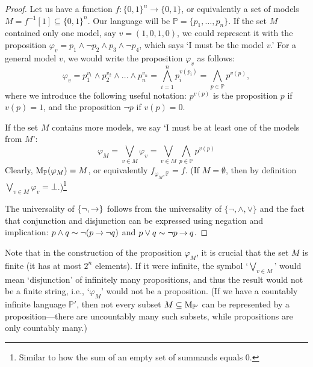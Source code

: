 \begin{proof}
Let us have a function $f\colon \{0,1\}^n\to \{0,1\}$, or equivalently a set of models $M = f^{-1}[1] \subseteq \{0,1\}^n$. Our language will be $\mathbb{P} = \{p_1, \dots, p_n\}$. If the set $M$ contained only one model, say $v = (1,0,1,0)$, we could represent it with the proposition $\varphi_v = p_1 \land \neg p_2 \land p_3 \land \neg p_4$, which says `I must be the model $v$.' For a general model $v$, we would write the proposition $\varphi_v$ as follows:
$$
\varphi_v = p_1^{v_1} \land p_2^{v_2} \land \dots \land p_n^{v_n} = \bigwedge_{i=1}^n p_i^{v(p_i)} = \bigwedge_{p \in \mathbb{P}} p^{v(p)},
$$
where we introduce the following useful notation: $p^{v(p)}$ is the proposition $p$ if $v(p) = 1$, and the proposition $\neg p$ if $v(p) = 0$.

If the set $M$ contains more models, we say `I must be at least one of the models from $M$':
$$
\varphi_M = \bigvee_{v \in M} \varphi_v = \bigvee_{v \in M} \bigwedge_{p \in \mathbb{P}} p^{v(p)}
$$
Clearly, $\operatorname{M}_\mathbb{P}(\varphi_M) = M$, or equivalently $f_{\varphi_M,\mathbb{P}} = f$. (If $M = \emptyset$, then by definition $\bigvee_{v \in M} \varphi_v = \bot$.)\footnote{Similar to how the sum of an empty set of summands equals 0.}

The universality of $\{\neg, \mathbin{\rightarrow}\}$ follows from the universality of $\{\neg, \land, \lor\}$ and the fact that conjunction and disjunction can be expressed using negation and implication: $p \land q \sim \neg (p \mathbin{\rightarrow} \neg q)$ and $p \lor q \sim \neg p \mathbin{\rightarrow} q$.
\end{proof}

\begin{remark}
Note that in the construction of the proposition $\varphi_M$, it is crucial that the set $M$ is finite (it has at most $2^n$ elements). If it were infinite, the symbol `$\bigvee_{v \in M}$' would mean `disjunction' of infinitely many propositions, and thus the result would not be a finite string, i.e., `$\varphi_M$' would not be a proposition. (If we have a countably infinite language $\mathbb{P}'$, then not every subset $M \subseteq \operatorname{M}_{\mathbb{P}'}$ can be represented by a proposition---there are uncountably many such subsets, while propositions are only countably many.)
\end{remark}

